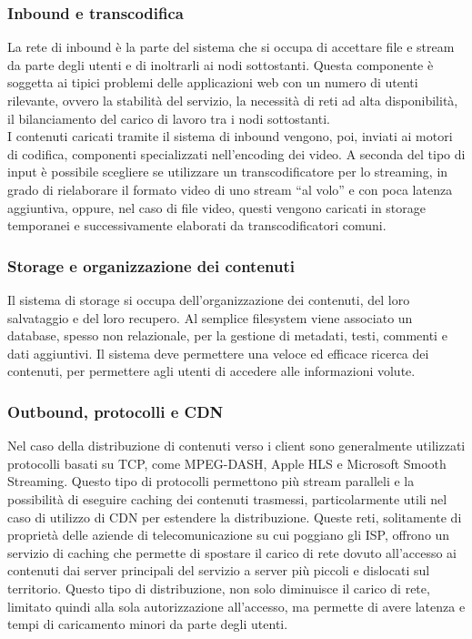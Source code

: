 		\subsubsection{Inbound e transcodifica}
			La rete di inbound è la parte del sistema che si occupa di accettare file e stream da parte degli utenti e di inoltrarli ai nodi sottostanti. Questa componente è soggetta ai tipici problemi delle applicazioni web con un numero di utenti rilevante, ovvero la stabilità del servizio, la necessità di reti ad alta disponibilità, il bilanciamento del carico di lavoro tra i nodi sottostanti.
			\\
			I contenuti caricati tramite il sistema di inbound vengono, poi, inviati ai motori di codifica, componenti specializzati nell'encoding dei video. A seconda del tipo di input è possibile scegliere se utilizzare un transcodificatore per lo streaming, in grado di rielaborare il formato video di uno stream ``al volo'' e con poca latenza aggiuntiva, oppure, nel caso di file video, questi vengono caricati in storage temporanei e successivamente elaborati da transcodificatori comuni.

		\subsubsection{Storage e organizzazione dei contenuti}
			Il sistema di storage si occupa dell'organizzazione dei contenuti, del loro salvataggio e del loro recupero. Al semplice filesystem viene associato un database, spesso non relazionale, per la gestione di metadati, testi, commenti e dati aggiuntivi. Il sistema deve permettere una veloce ed efficace ricerca dei contenuti, per permettere agli utenti di accedere alle informazioni volute.

		\subsubsection{Outbound, protocolli e \gls{CDN}}
			Nel caso della distribuzione di contenuti verso i client sono generalmente utilizzati protocolli basati su TCP, come MPEG-DASH, Apple HLS e Microsoft Smooth Streaming. Questo tipo di protocolli permettono più stream paralleli e la possibilità di eseguire caching dei contenuti trasmessi, particolarmente utili nel caso di utilizzo di \gls{CDN} per estendere la distribuzione. Queste reti, solitamente di proprietà delle aziende di telecomunicazione su cui poggiano gli ISP, offrono un servizio di caching che permette di spostare il carico di rete dovuto all'accesso ai contenuti dai server principali del servizio a server più piccoli e dislocati sul territorio. Questo tipo di distribuzione, non solo diminuisce il carico di rete, limitato quindi alla sola autorizzazione all'accesso, ma permette di avere latenza e tempi di caricamento minori da parte degli utenti.			

